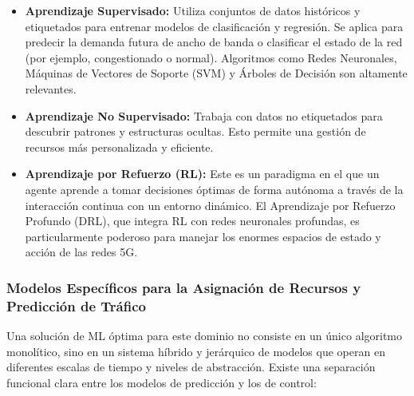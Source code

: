 \documentclass[12pt,a4paper]{article}
\begin{document}
\begin{itemize}
    \item \textbf{Aprendizaje Supervisado:} Utiliza conjuntos de datos históricos y etiquetados para entrenar modelos de clasificación y regresión. Se aplica para predecir la demanda futura de ancho de banda o clasificar el estado de la red (por ejemplo, congestionado o normal). Algoritmos como Redes Neuronales, Máquinas de Vectores de Soporte (SVM) y Árboles de Decisión son altamente relevantes\cite{ref33}.
    
    \item \textbf{Aprendizaje No Supervisado:} Trabaja con datos no etiquetados para descubrir patrones y estructuras ocultas\cite{ref32}. Esto permite una gestión de recursos más personalizada y eficiente.
    
    \item \textbf{Aprendizaje por Refuerzo (RL):} Este es un paradigma en el que un agente aprende a tomar decisiones óptimas de forma autónoma a través de la interacción continua con un entorno dinámico. El Aprendizaje por Refuerzo Profundo (DRL), que integra RL con redes neuronales profundas, es particularmente poderoso para manejar los enormes espacios de estado y acción de las redes 5G\cite{ref22}.
\end{itemize}

\subsubsection{Modelos Específicos para la Asignación de Recursos y Predicción de Tráfico}

Una solución de ML óptima para este dominio no consiste en un único algoritmo monolítico, sino en un sistema híbrido y jerárquico de modelos que operan en diferentes escalas de tiempo y niveles de abstracción. Existe una separación funcional clara entre los modelos de predicción y los de control:
\end{document}
